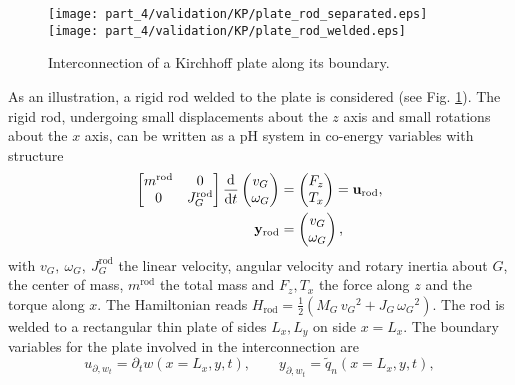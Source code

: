 \begin{figure}[tb]
	\centering
	\texttt{[image: part\_4/validation/KP/plate\_rod\_separated.eps]} 
	\texttt{[image: part\_4/validation/KP/plate\_rod\_welded.eps]} 
	\caption{Interconnection of a Kirchhoff plate along its boundary.}
	\label{fig:sketchRodPlate}
\end{figure}

As an illustration, a rigid rod welded to the plate is considered  (see Fig. \ref{fig:sketchRodPlate}). The rigid rod, undergoing small displacements about the $z$ axis and small rotations about the $x$ axis, can be written as a pH system in co-energy variables with structure
\begin{equation}
\begin{aligned}
\begin{bmatrix}
m^{\mathrm{rod}} & 0 \\
0   & J_G^{\mathrm{rod}} \\
\end{bmatrix} 
\displaystyle \diff{}{t}
\begin{pmatrix}
v_G \\ \omega_G \\
\end{pmatrix} & = \begin{pmatrix}
F_z \\ T_x \\
\end{pmatrix} = \mathbf{u}_{\text{rod}}\vspace{1mm}, \\
\mathbf{y}_{\text{rod}} &= \begin{pmatrix}
v_G \\ \omega_{G} \\
\end{pmatrix},
\end{aligned}
\end{equation}
with $v_G, \ \omega_{G}, \ J_G^{\mathrm{rod}}$ the linear velocity, angular velocity and rotary inertia about $G$, the center of mass, $m^{\mathrm{rod}}$ the total mass  and $F_z, T_x$ the force along $z$ and the torque along $x$. The Hamiltonian reads $H_{\text{rod}}  = \frac{1}{2} \left(M_G \, {v_G}^2 + J_G \, {\omega_G}^2 \right)$. The rod is welded to a rectangular thin plate of sides $L_x, L_y$ on side $x = L_x$. The boundary variables for the plate involved in the interconnection are 
\begin{equation*}
u_{\partial, w_t} = \partial_t w(x = L_x, y, t),  \qquad  y_{\partial, w_t} = \widetilde{q}_n(x = L_x, y, t),
\end{equation*}
